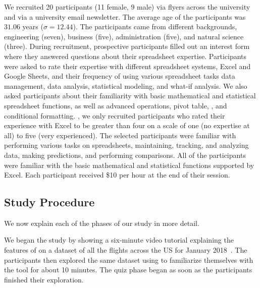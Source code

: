  We recruited 20 participants (11 female, 9 male) via flyers across the university and via a university email newsletter. 
The average age of the participants was $31.06$ years ($\sigma = 12.44$). 
The participants came from different backgrounds, 
\eg engineering (seven), business (five), administration (five), and natural science (three). 
During recruitment, 
prospective participants filled out an interest form
where they answered questions about their spreadsheet expertise.
Participants were asked to rate their expertise with
different spreadsheet systems, \eg Excel and Google Sheets, 
and their frequency of using various spreadsheet 
tasks \eg data management, data analysis, statistical modeling, and what-if analysis.
We also asked participants about their familiarity 
with basic mathematical and statistical spreadsheet functions,
as well as advanced operations, \eg pivot table,
 , and conditional formatting. 
, 
we only recruited participants who rated their experience 
with Excel to be greater than four on a scale of one (no expertise at all) to five (very experienced). 
The selected participants were familiar with performing 
various tasks on spreadsheets, \eg maintaining, tracking, and
analyzing data, making predictions, and performing comparisons. 
All of the participants were familiar with the basic mathematical
and statistical functions supported by Excel. 
Each participant received \$10 per hour at the end of their session.

\subsection{Study Procedure}
\label{sec:procedure}
We now explain each of the phases of our study in more detail.
 
We began the study by showing a six-minute video tutorial explaining the features of \noah on a dataset of all the flights across the US for January 2018~\cite{web:flight}. The participants then explored the same dataset using \noah to familiarize themselves with the tool for about 10 minutes. The quiz phase began as soon as the participants finished their exploration. 

